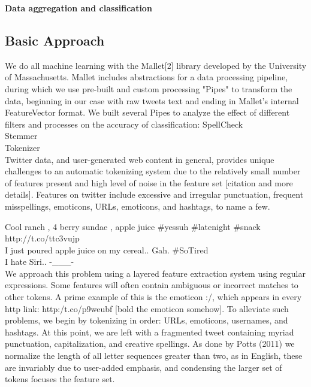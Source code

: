 \documentclass[letterpaper]{article}
\begin{document}
\textbf{Data aggregation and classification}\\

\subsection{Basic Approach}

We do all machine learning with the Mallet[2] library developed by the University of Massachusetts. Mallet includes abstractions for a data processing pipeline, during which we use pre-built and custom processing "Pipes" to transform the data, beginning in our case with raw tweets text and ending in Mallet's internal FeatureVector format. We built several Pipes to analyze the effect of different filters and processes on the accuracy of classification:
SpellCheck\\

Stemmer\\

Tokenizer\\
Twitter data, and user-generated web content in general, provides unique challenges to an automatic tokenizing system due to the relatively small number of features present and high level of noise in the feature set [citation and more details]. Features on twitter include excessive and irregular punctuation, frequent misspellings, emoticons, URLs, emoticons, and hashtags, to name a few.

Cool ranch , 4 berry sundae , apple juice #yessuh #latenight #snack http://t.co/ttc3vujp \\
I just poured apple juice on my cereal.. Gah. #SoTired \\
I hate Siri.. -___- \\

We approach this problem using a layered feature extraction system using regular expressions. Some features will often contain ambiguous or incorrect matches to other tokens. A prime example of this is the emoticon :/, which appears in every http link: http:/t.co/p9weubf [bold the emoticon somehow]. To alleviate such problems, we begin by tokenizing in order: URLs, emoticons, usernames, and hashtags. At this point, we are left with a fragmented tweet containing myriad punctuation, capitalization, and creative spellings. As done by Potts (2011) we normalize the length of all letter sequences greater than two, as in English, these are invariably due to user-added emphasis, and condensing the larger set of tokens focuses the feature set.\\
\end{document}
